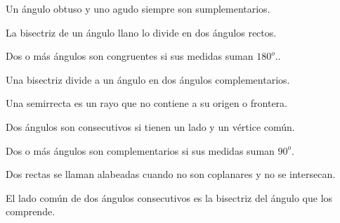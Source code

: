 \documentclass[fleqn]{article}
\begin{document}
\item Un ángulo obtuso y uno agudo siempre son sumplementarios. \hfill \fv
\item La bisectriz de un ángulo llano lo divide en dos ángulos rectos. \hfill \fv
\item Dos o más ángulos son congruentes si sus medidas suman $180^o$.. \hfill \fv
\item Una bisectriz divide a un ángulo en dos ángulos complementarios. \hfill \fv
\item Una semirrecta es un rayo que no contiene a su origen o frontera. \hfill \fv
\item Dos ángulos son consecutivos si tienen un lado y un vértice común. \hfill \fv
\item Dos o más ángulos son complementarios si sus medidas suman $90^o$. \hfill \fv
\item Dos rectas se llaman alabeadas cuando no son coplanares y no se intersecan. \hfill \fv
\item El lado común de dos ángulos consecutivos es la bisectriz del ángulo que los comprende. \hfill \fv

\eenu
\end{document}
